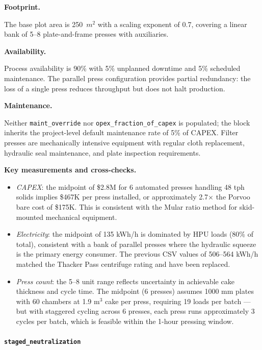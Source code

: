 \medskip
\noindent\textbf{Footprint.}\quad

The base plot area is 250~$\si{m^2}$ with a scaling exponent of 0.7, covering a linear bank of 5--8 plate-and-frame presses with auxiliaries.

\medskip
\noindent\textbf{Availability.}\quad

Process availability is 90\% with 5\% unplanned downtime and 5\% scheduled maintenance. The parallel press configuration provides partial redundancy: the loss of a single press reduces throughput but does not halt production.

\medskip
\noindent\textbf{Maintenance.}\quad

Neither \texttt{maint\_override} nor \texttt{opex\_fraction\_of\_capex} is populated; the block inherits the project-level default maintenance rate of 5\% of CAPEX. Filter presses are mechanically intensive equipment with regular cloth replacement, hydraulic seal maintenance, and plate inspection requirements.

\medskip
\noindent\textbf{Key measurements and cross-checks.}\quad

\begin{itemize}[noitemsep]
	\item \textit{CAPEX}: the midpoint of \$2.8M for 6 automated presses handling 48 tph solids implies \$467K per press installed, or approximately 2.7$\times$ the Porvoo bare cost of \$175K. This is consistent with the Mular ratio method for skid-mounted mechanical equipment.
	\item \textit{Electricity}: the midpoint of 135 kWh/h is dominated by HPU loads (80\% of total), consistent with a bank of parallel presses where the hydraulic squeeze is the primary energy consumer. The previous CSV values of 506--564 kWh/h matched the Thacker Pass centrifuge rating and have been replaced.
	\item \textit{Press count}: the 5--8 unit range reflects uncertainty in achievable cake thickness and cycle time. The midpoint (6 presses) assumes 1000 mm plates with 60 chambers at 1.9 m$^3$ cake per press, requiring 19 loads per batch --- but with staggered cycling across 6 presses, each press runs approximately 3 cycles per batch, which is feasible within the 1-hour pressing window.
\end{itemize}

\clearpage
\paragraph{\texttt{staged\_neutralization}}\label{app:04-methods-blockdefs-neutralization}


